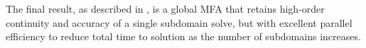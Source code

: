 The final result, as described in , is a global MFA that retains high-order continuity and accuracy of a single subdomain solve, but with excellent parallel efficiency to reduce total time to solution as the number of subdomains increases.




